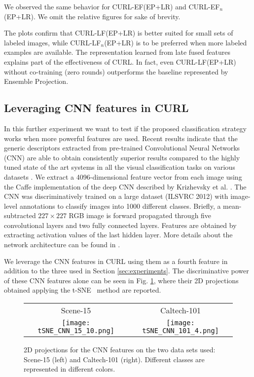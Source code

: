 \documentclass[journal,11pt]{IEEEtran}
\newcommand{\coso}{strategy}
\newcommand{\curlef}{CURL-EF(EP+LR)}
\newcommand{\curllf}{CURL-LF(EP+LR)}
\newcommand{\curlefn}{CURL-EF$_n$(EP+LR)}
\newcommand{\curllfn}{CURL-LF$_n$(EP+LR)}
\begin{document}
We observed the same behavior for \curlef{ }and \curlefn. We omit the relative figures for sake of brevity. %

The plots confirm that \curllf{ }is better suited for small sets of
labeled images, while \curllfn{ }is to be preferred when more labeled
examples are available. The representation learned from late fused
features explains part of the effectiveness of CURL. In fact, even
\curllf{ }without co-training (zero rounds) outperforms the baseline
represented by Ensemble Projection.



\subsection{Leveraging CNN features in CURL}
\label{subsec:cnn}
In this further experiment we want to test if the proposed classification \coso{ }works when more powerful features are used. Recent results indicate that the generic descriptors extracted from pre-trained Convolutional Neural Networks (CNN) are able to obtain consistently superior results compared to the highly tuned state of the art systems in all the visual classification tasks on various datasets \cite{razavian2014cnn}.
We extract a 4096-dimensional feature vector from each image using the Caffe \cite{jia2014caffe} implementation of the deep CNN described by Krizhevsky et al. \cite{krizhevsky2012imagenet}.
The CNN was discriminatively trained on a large dataset (ILSVRC 2012) with image-level annotations to classify images into 1000 different classes.
Briefly, a mean-subtracted $227 \times 227$ RGB image is forward propagated through five convolutional layers and two fully connected layers. Features are obtained by extracting activation values of the last hidden layer. More details about the network architecture can be found in \cite{krizhevsky2012imagenet,jia2014caffe}.

We leverage the CNN features in CURL using them as a fourth feature in addition to the three used in Section \ref{sec:experiments}. The discriminative power of these CNN features alone can be seen in Fig. \ref{fig:tsneCNN}, where their 2D projections obtained applying the t-SNE~\cite{van2008visualizing} method are reported.

\begin{figure}[tbp]%
\centering
\begin{tabular}{cc}
\footnotesize{Scene-15} & \footnotesize{Caltech-101}\\
\texttt{[image: tSNE\_CNN\_15\_10.png]} &
\texttt{[image: tSNE\_CNN\_101\_4.png]} \\
\end{tabular}
\caption{2D projections for the CNN features on the two data sets used: Scene-15 (left) and Caltech-101 (right). Different classes are represented in different colors.}%
\label{fig:tsneCNN}%
\end{figure}
\end{document}
